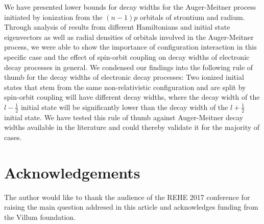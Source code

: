 \documentclass[aps,amssymb,preprint,a4paper,longbibliography]{revtex4}
\begin{document}
We have presented lower bounds for
decay widths for the Auger-Meitner process initiated by
ionization from the $(n-1)p$ orbitals of strontium and radium.
Through analysis of results from different Hamiltonians and initial state
eigenvectors as well as radial densities of orbitals involved in the
Auger-Meitner process, we were able to show the importance of configuration interaction
in this specific case and the effect of spin-orbit coupling on decay widths
of electronic decay processes in general.
We condensed our findings into the following rule of thumb for the decay widths
of electronic decay processes:
Two ionized initial states that stem from the same non-relativistic configuration and
are split by spin-orbit coupling will have different decay widths, where the decay width
of the $l-\frac12$ initial state will be significantly lower than the decay width of
the $l + \frac12$ initial state.
{We have tested this rule of thumb against Auger-Meitner decay widths available in the
literature and could thereby validate it for the majority
of cases.}

%
\section{Acknowledgements}
The author would like to thank the audience of the REHE 2017 conference for
raising the main question addresed in this article
and acknowledges funding from the Villum foundation.

\clearpage

%
%
\end{document}
